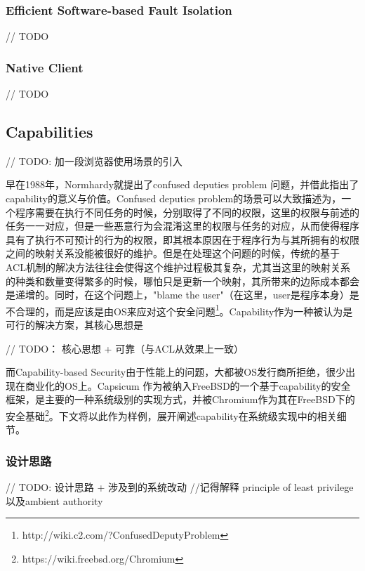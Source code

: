 \documentclass[final,12pt]{elsarticle}
\begin{document}
\subsubsection{Efficient Software-based Fault Isolation}
\label{sss:esfi}

// TODO

\subsubsection{Native Client}
\label{sss:nacl}

// TODO

\subsection{Capabilities}
\label{ss:capabilities}

// TODO: 加一段浏览器使用场景的引入

早在1988年，Normhardy就提出了confused deputies problem \cite{deputies} 问题，并借此指出了capability的意义与价值。Confused deputies problem的场景可以大致描述为，一个程序需要在执行不同任务的时候，分别取得了不同的权限，这里的权限与前述的任务一一对应，但是一些恶意行为会混淆这里的权限与任务的对应，从而使得程序具有了执行不可预计的行为的权限，即其根本原因在于程序行为与其所拥有的权限之间的映射关系没能被很好的维护。但是在处理这个问题的时候，传统的基于ACL机制的解决方法往往会使得这个维护过程极其复杂，尤其当这里的映射关系的种类和数量变得繁多的时候，哪怕只是更新一个映射，其所带来的边际成本都会是递增的。同时，在这个问题上，"blame the user"（在这里，user是程序本身）是不合理的，而是应该是由OS来应对这个安全问题\footnote{http://wiki.c2.com/?ConfusedDeputyProblem}。Capability作为一种被认为是可行的解决方案，其核心思想是

// TODO： 核心思想 + 可靠（与ACL从效果上一致）

而Capability-based Security由于性能上的问题，大都被OS发行商所拒绝，很少出现在商业化的OS上。Capsicum \cite{capsicum} 作为被纳入FreeBSD的一个基于capability的安全框架，是主要的一种系统级别的实现方式，并被Chromium作为其在FreeBSD下的安全基础\footnote{https://wiki.freebsd.org/Chromium}。下文将以此作为样例，展开阐述capability在系统级实现中的相关细节。

\subsubsection{设计思路}
\label{sss:design}

// TODO: 设计思路 + 涉及到的系统改动
//记得解释 principle of least privilege以及ambient authority
\end{document}
